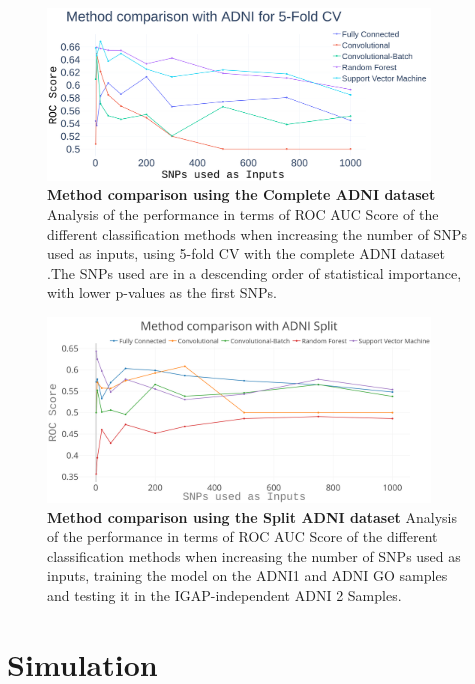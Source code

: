 \begin{figure}[!ht]
\centerline{\includegraphics[width=4in]{images/results/AdniCV.png}}
\caption{{\bf Method comparison using the Complete ADNI dataset}
Analysis of the performance in terms of ROC AUC Score of the different classification methods when increasing the number of SNPs used as inputs, using 5-fold CV with the complete ADNI dataset .The SNPs used are in a descending order of statistical importance, with lower p-values as the first SNPs.}
\label{fig4}
\end{figure}

\begin{figure}[!ht]
\centerline{\includegraphics[width=4in]{images/results/AdniSplit2.png}}
\caption{{\bf Method comparison using the Split ADNI dataset}
Analysis of the performance in terms of ROC AUC Score of the different classification methods when increasing the number of SNPs used as inputs, training the model on the ADNI1 and ADNI GO samples and testing it in the IGAP-independent ADNI 2 Samples. }
\label{fig5}
\end{figure}

\section{Simulation}

